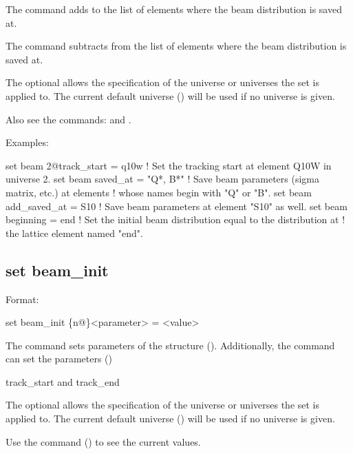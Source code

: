 {{The  command adds to the list of elements where the beam
distribution is saved at.

The  command subtracts from the list of elements where the beam
distribution is saved at.

The optional  allows the specification of the universe or universes the set is applied to.
The current default universe () will be used if no universe is given.

Also see the commands:  and .

Examples:
\begin{example}
  set beam 2@track_start = q10w  ! Set the tracking start at element Q10W in universe 2.
  set beam saved_at = "Q*, B*"   ! Save beam parameters (sigma matrix, etc.) at elements
                                 !  whose names begin with "Q" or "B".
  set beam add_saved_at = S10    ! Save beam parameters at element "S10" as well.
  set beam beginning = end       ! Set the initial beam distribution equal to the distribution at
                                 !  the lattice element named "end".
\end{example}


\subsection{set beam_init}
\label{s:set.beam.init}

Format:
\begin{example}
  set beam_init \{n@\}<parameter> = <value>
\end{example}

The  command sets parameters of the  structure ().
Additionally, the  command can set the parameters ()
\begin{example}
  track_start  and
  track_end
\end{example}

The optional  allows the specification of the universe or universes the set is applied to.
The current default universe () will be used if no universe is given.

Use the  command () to see the current values.

}}
